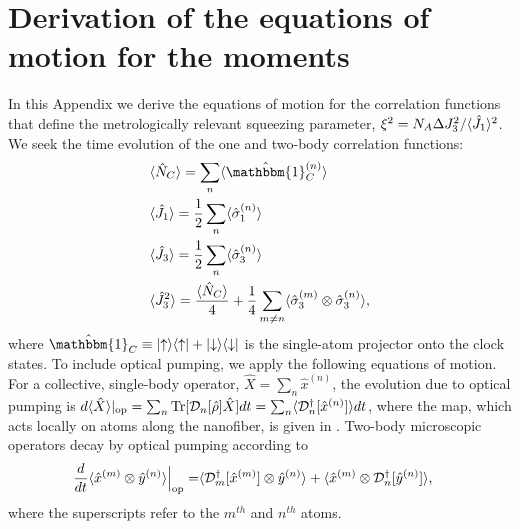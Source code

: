 \section[Equations of motion for the moments]{Derivation of the equations of motion for the moments} \label{Appendix::OpticalPumping}	

In this Appendix we derive the equations of motion for the correlation functions that define the metrologically relevant squeezing parameter, $\xi^2 = N_A \Delta J_3^2/\langle{\hat{J}_1}\rangle^2$.  
We seek the time evolution of the one and two-body correlation functions:
\begin{subequations}
\begin{align}
&\expt{\hat{N}_C} = \sum_n \expt{\hat{\mathbbm{1}}^{(n)}_C} \\
&\expt{\hat{J}_1} = \frac{1}{2} \sum_n \expt{\hat{\sigma}_1^{(n)}} \\
&\expt{\hat{J}_3} = \frac{1}{2} \sum_n \expt{\hat{\sigma}_3^{(n)}} \\
&\expt{\hat{J}_3^2} = \frac{\expt{\hat{N}_C}}{4} +\frac{1}{4} \sum_{m \neq n} \expt{\hat{\sigma}_3^{(m)}\otimes \hat{\sigma}_3^{(n)}}, 
\end{align}
\end{subequations}
where $\hat{\mathbbm{1}}_C \equiv \op{\uparrow}{\uparrow} + \op{\downarrow}{\downarrow}$ is the single-atom projector onto the clock states. 
To include optical pumping, we apply the following equations of motion. For a collective, single-body operator, $\hat{X} = \sum_n \hat{x}^{(n)}$, the evolution due to optical pumping is $d\langle{ \hat{X}}\rangle|_{\rm op} = \sum_n \mbox{Tr} [\mathcal{D}_n[\hat{\rho}]\hat{X} ]dt = \sum_n \langle{\mathcal{D}_n^\dagger[\hat{x}^{(n)}]}\rangle dt$, where the map, which acts locally on atoms along the nanofiber, is given in .  
Two-body microscopic operators decay by optical pumping according to \cite{baragiola_three-dimensional_2014}
	\begin{align} \label{Eq::TwoBodyDecay}
		\frac{d}{dt} \expt{ \hat{x}^{(m)} \otimes \hat{y}^{(n)} } \Big|_{\rm op}= &\expt{ \mathcal{D}_m\dg[ \hat{x}^{(m)}] \otimes \hat{y}^{(n)} } + \expt{ \hat{x}^{(m)}\otimes \mathcal{D}_n\dg[ \hat{y}^{(n)}] },
	\end{align}
where the superscripts refer to the $m^{th}$ and $n^{th}$ atoms. 

